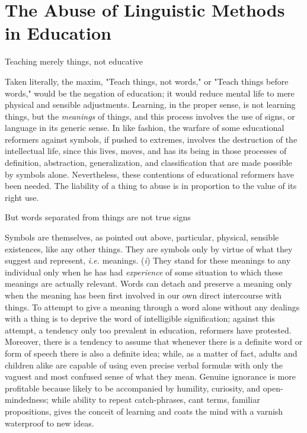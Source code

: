 \documentclass[letterpaper]{book}
\begin{document}
\section{The Abuse of Linguistic Methods in Education}

Teaching merely things, not educative

Taken literally, the maxim, "Teach things, not words," or "Teach things
before words," would be the negation of education; it would reduce
mental life to mere physical and sensible adjustments. Learning, in the
proper sense, is not learning things, but the \emph{meanings} of things,
and this process involves the use of signs, or language in its generic
sense. In like fashion, the warfare of some educational reformers
against symbols, if pushed to extremes, involves the destruction of the
intellectual life, since this lives, moves, and has its being in those
processes of definition, abstraction, generalization, and classification
that are made possible by symbols alone. Nevertheless, these contentions
of educational reformers have been needed. The liability of a thing to
abuse is in proportion to the value of its right use.

But words separated from things are not true signs

Symbols are themselves, as pointed out above, particular, physical,
sensible existences, like any other things. They are symbols only by
virtue of what they suggest and represent, \emph{i.e.} meanings.
(\emph{i}) They stand for these meanings to any individual only when he
has had \emph{experience} of some situation to which these meanings are
actually relevant. Words can detach and preserve a meaning only when the
meaning has been first involved in our own direct intercourse with
things. To attempt to give a meaning through a word alone without any
dealings with a thing is to deprive the word of intelligible
signification; against this attempt, a tendency only too prevalent in
education, reformers have protested. Moreover, there is a tendency to
assume that whenever there is a definite word or form of speech there is
also a definite idea; while, as a matter of fact, adults and children
alike are capable of using even precise verbal
formulæ
with only the vaguest and most confused sense of what they mean. Genuine
ignorance is more profitable because likely to be accompanied by
humility, curiosity, and open-mindedness; while ability to repeat
catch-phrases, cant terms, familiar propositions, gives the conceit of
learning and coats the mind with a varnish waterproof to new ideas.
\end{document}
